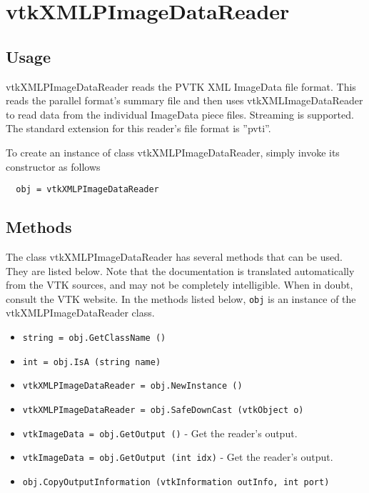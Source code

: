 \section{vtkXMLPImageDataReader}

\subsection{Usage}

 vtkXMLPImageDataReader reads the PVTK XML ImageData file format.
 This reads the parallel format's summary file and then uses
 vtkXMLImageDataReader to read data from the individual ImageData
 piece files.  Streaming is supported.  The standard extension for
 this reader's file format is ''pvti''.

To create an instance of class vtkXMLPImageDataReader, simply
invoke its constructor as follows
\begin{verbatim}
  obj = vtkXMLPImageDataReader
\end{verbatim}
\subsection{Methods}

The class vtkXMLPImageDataReader has several methods that can be used.
  They are listed below.
Note that the documentation is translated automatically from the VTK sources,
and may not be completely intelligible.  When in doubt, consult the VTK website.
In the methods listed below, \verb|obj| is an instance of the vtkXMLPImageDataReader class.
\begin{itemize}
\item  \verb|string = obj.GetClassName ()|

\item  \verb|int = obj.IsA (string name)|

\item  \verb|vtkXMLPImageDataReader = obj.NewInstance ()|

\item  \verb|vtkXMLPImageDataReader = obj.SafeDownCast (vtkObject o)|

\item  \verb|vtkImageData = obj.GetOutput ()| -  Get the reader's output.

\item  \verb|vtkImageData = obj.GetOutput (int idx)| -  Get the reader's output.

\item  \verb|obj.CopyOutputInformation (vtkInformation outInfo, int port)|

\end{itemize}
